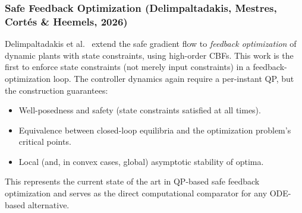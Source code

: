 \documentclass[11pt,onecolumn]{article}
\theoremstyle{definition}
\theoremstyle{remark}
\begin{document}
\subsubsection{Safe Feedback Optimization (Delimpaltadakis, Mestres, Cort\'{e}s \& Heemels, 2026)}

Delimpaltadakis et al.\ \cite{delimpaltadakis2026} extend the safe gradient flow to \emph{feedback optimization} of dynamic plants with state constraints, using high-order CBFs. This work is the first to enforce state constraints (not merely input constraints) in a feedback-optimization loop. The controller dynamics again require a per-instant QP, but the construction guarantees:
\begin{itemize}
    \item Well-posedness and safety (state constraints satisfied at all times).
    \item Equivalence between closed-loop equilibria and the optimization problem's critical points.
    \item Local (and, in convex cases, global) asymptotic stability of optima.
\end{itemize}
This represents the current state of the art in QP-based safe feedback optimization and serves as the direct computational comparator for any ODE-based alternative.
\end{document}

